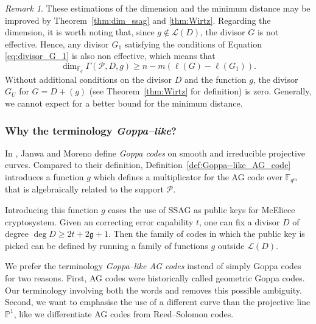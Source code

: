 \documentclass[a4paper]{amsart}
\theoremstyle{definition}
\theoremstyle{remark}
\newtheorem{remark}[thm]{Remark}
\newcommand{\calP}{\mathcal{P}}
\newcommand{\calL}{\mathcal{L}}
\newcommand{\fqm}{\mathbb{F}_{q^m}}
\newcommand{\fq}{\mathbb{F}_{q}}
\newcommand{\PP}{\mathbb{P}}
\begin{document}
\begin{remark}
These estimations of the dimension and the minimum distance may be improved by Theorem~\ref{thm:dim_ssag} and \ref{thm:Wirtz}. Regarding the dimension, it is worth noting that, since $g \notin \calL(D)$, the divisor $G$ is not effective. Hence, any divisor $G_1$ satisfying the conditions of Equation \ref{eq:divisor_G_1} is also non effective, which means that
\[	\dim_{\fq}  \Gamma(\calP,D,g) \geq 	n-m\left(\ell(G) - \ell(G_1)\right). \]
Without additional conditions on the divisor $D$ and the function $g$, the divisor $G_U$ for $G=D+(g)$ (see Theorem~\ref{thm:Wirtz} for definition) is zero. Generally, we cannot expect for a better bound for the minimum distance. 
\end{remark}



\subsubsection{Why the terminology \textit{Goppa--like}?}

In \cite{JM96}, Janwa and Moreno define \emph{Goppa codes} on smooth and irreducible projective curves. Compared to their definition, Definition~\ref{def:Goppa--like_AG_code} introduces a function $g$ which defines a multiplicator for the AG code over $\fqm$ that is algebraically related to the support $\calP$.

Introducing this function $g$ eases the use of SSAG as public keys for McEliece cryptosystem. Given an correcting error capability $t$, one can fix a divisor $D$ of degree $\deg D \geq 2t + 2\mathfrak{g}+1$. Then the family of codes in which the public key is picked can be defined by running a family of functions $g$ outside $\calL(D)$.

\medskip

We prefer the terminology \emph{Goppa--like AG codes} instead of simply Goppa codes for two reasons. First, AG codes were historically called geometric Goppa codes. Our terminology involving both the words  and  removes this possible ambiguity. Second, we want to emphasise the use of a different curve than the projective line $\PP^1$, like we differentiate AG codes from Reed--Solomon codes.
\end{document}
